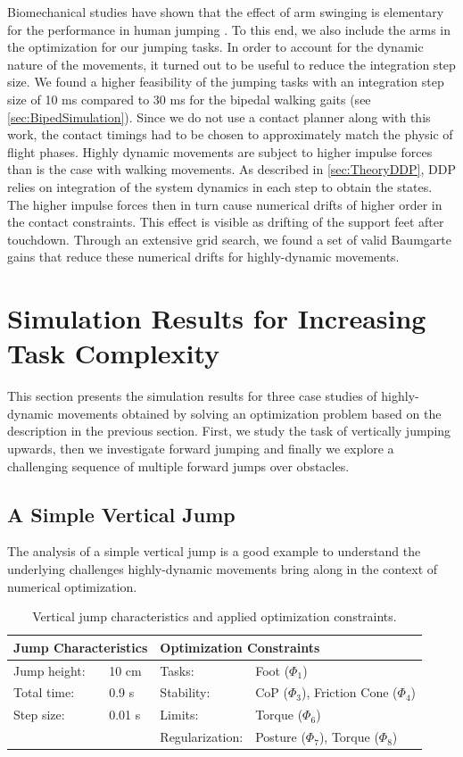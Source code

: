 Biomechanical studies have shown that the effect of arm swinging is elementary for the performance in human jumping \cite{harman1990effects}. To this end, we also include the arms in the optimization for our jumping tasks. 
In order to account for the dynamic nature of the movements, it turned out to be useful to reduce the integration step size. We found a higher feasibility of the jumping tasks with an integration step size of 10 ms compared to 30 ms for the bipedal walking gaits (see \cref{sec:BipedSimulation}). Since we do not use a contact planner along with this work, the contact timings had to be chosen to approximately match the physic of flight phases. 
Highly dynamic movements are subject to higher impulse forces than is the case with walking movements. As described in \ref{sec:TheoryDDP}, \gls{DDP} relies on integration of the system dynamics in each step to obtain the states. The higher impulse forces then in turn cause numerical drifts of higher order in the contact constraints. This effect is visible as drifting of the support feet after touchdown. Through an extensive grid search, we found a set of valid Baumgarte gains that reduce these numerical drifts for highly-dynamic movements.

\section{Simulation Results for Increasing Task Complexity}\label{sec:HighlySimulation}
This section presents the simulation results for three case studies of highly-dynamic movements obtained by solving an optimization problem based on the description in the previous section. First, we study the task of vertically jumping upwards, then we investigate forward jumping and finally we explore a challenging sequence of multiple forward jumps over obstacles.

\subsection{A Simple Vertical Jump}
The analysis of a simple vertical jump is a good example to understand the underlying challenges highly-dynamic movements bring along in the context of numerical optimization.

\begin{table}[t]
\centering
\caption[Vertical jump characteristics and optimization constraints]{Vertical jump characteristics and applied optimization constraints.}
\begin{tabular}{|ll|ll|}
\hline
\multicolumn{2}{|l|}{\textbf{Jump Characteristics}} & \multicolumn{2}{l|}{\textbf{Optimization Constraints}} \\ \hline
Jump height:& 10 cm 	& Tasks: 			& Foot ($\Phi_1$) \\ \hline
Total time:& 0.9 s 		& Stability:    & \gls{CoP} ($\Phi_3$), Friction Cone ($\Phi_4$)\\ \hline
Step size:& 0.01 s 	& Limits: 			& Torque ($\Phi_6$)\\ \hline
& 					& Regularization: 	& Posture ($\Phi_7$), Torque ($\Phi_8$)\\ \hline
\end{tabular}
\label{tab:jumpVertical}
\end{table}

